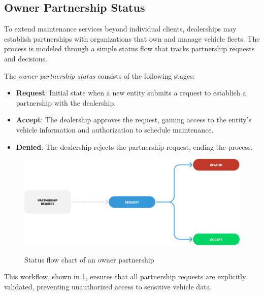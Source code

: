 \subsection{Owner Partnership Status} 

To extend maintenance services beyond individual clients, dealerships may establish partnerships with organizations that own and manage vehicle fleets. The process is modeled through a simple status flow that tracks partnership requests and decisions.

The \textit{owner partnership status} consists of the following stages:

\begin{itemize}
\item \textbf{Request}: Initial state when a new entity submits a request to establish a partnership with the dealership.
\item \textbf{Accept}: The dealership approves the request, gaining access to the entity's vehicle information and authorization to schedule maintenance.
\item \textbf{Denied}: The dealership rejects the partnership request, ending the process.
\end{itemize}

\begin{figure}[h]
  \caption{Status flow chart of an owner partnership}
  \centering
  \includegraphics[width=\textwidth]{figs/Status/OwnerPartnership_StatusDiagram}
  \label{fig:ownerPartnershipFlowChart}
\end{figure}

This workflow, shown in \ref{fig:ownerPartnershipFlowChart}, ensures that all partnership requests are explicitly validated, preventing unauthorized access to sensitive vehicle data.






